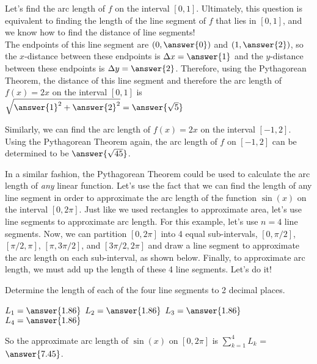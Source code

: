 \documentclass[handout,nooutcomes]{ximera}
\begin{document}
\begin{problem}
Let's find the arc length of $f$ on the interval $[0,1]$.  Ultimately, this question is equivalent to finding the length of the line segment of $f$ that lies in $[0,1]$, and we know how to find the distance of line segments!  \\

The endpoints of this line segment are $(0,\answer{0})$ and $(1,\answer{2})$, so the $x$-distance between these endpoints is $\Delta x = \answer{1}$ and the $y$-distance between these endpoints is $\Delta y = \answer{2}$.  Therefore, using the Pythagorean Theorem, the distance of this line segment and therefore the arc length of $f(x) = 2x$ on the interval $[0,1]$ is $\sqrt{\answer{1}^2+\answer{2}^2} = \answer{\sqrt{5}}$
\end{problem}

\begin{problem}
Similarly, we can find the arc length of $f(x)=2x$ on the interval $[-1,2]$.  Using the Pythagorean Theorem again, the arc length of $f$ on $[-1,2]$ can be determined to be $\answer{\sqrt{45}}$.
\end{problem}

In a similar fashion, the Pythagorean Theorem could be used to calculate the arc length of \textit{any} linear function.  Let's use the fact that we can find the length of any line segment in order to approximate the arc length of the function $\sin(x)$ on the interval $[0, 2\pi]$.  Just like we used rectangles to approximate area, let's use line segments to approximate arc length.  For this example, let's use $n=4$ line segments.  Now, we can partition $[0, 2\pi]$ into 4 equal sub-intervals, $[0, \pi/2]$, $[\pi/2, \pi]$, $[\pi, 3\pi/2]$, and $[3\pi/2, 2\pi]$ and draw a line segment to approximate the arc length on each sub-interval, as shown below.  Finally, to approximate arc length, we must add up the length of these 4 line segments.  Let's do it! \\


\begin{problem}
Determine the length of each of the four line segments to 2 decimal places.

$L_1 = \answer{1.86}$
$L_2 = \answer{1.86}$
$L_3 = \answer{1.86}$
$L_4 = \answer{1.86}$

So the approximate arc length of $\sin(x)$ on $[0, 2\pi]$ is $\displaystyle\sum_{k=1}^4 L_k$ = $\answer{7.45}$.
\end{problem}
\end{document}
